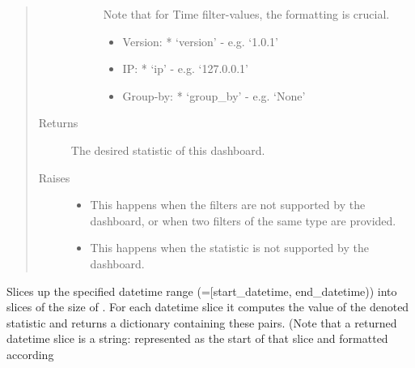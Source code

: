 \documentclass[letterpaper,10pt,english]{sphinxmanual}
\begin{document}
\begin{fulllineitems}
\begin{fulllineitems}
\begin{quote}
\begin{description}
\begin{description}
Note that for Time filter-values, the formatting is crucial.
\begin{itemize}
\item {} 
Version:
* ‘version’ - e.g. ‘1.0.1’

\item {} 
IP:
* ‘ip’ - e.g. ‘127.0.0.1’

\item {} 
Group-by:
* ‘group\_by’ - e.g. ‘None’

\end{itemize}

\end{description}


\item[{Returns}] \leavevmode
The desired statistic of this dashboard.

\item[{Raises}] \leavevmode\begin{itemize}
\item {} 
 \textendash{} This happens when the filters are not supported by the dashboard, or when two filters of
the same type are provided.

\item {} 
 \textendash{} This happens when the statistic is not supported by the dashboard.

\end{itemize}

\end{description}\end{quote}

\end{fulllineitems}


\begin{fulllineitems}
\label{\detokenize{pydash_app.dashboard.entity:pydash_app.dashboard.entity.Dashboard.statistic_per_timeslice}}
Slices up the specified datetime range (={[}start\_datetime, end\_datetime)) into slices of the size of .
For each datetime slice it computes the value of the denoted statistic and returns a dictionary containing these pairs.
(Note that a returned datetime slice is a string: represented as the start of that slice and formatted according
\begin{quote}


\end{quote}
\end{fulllineitems}
\end{fulllineitems}
\end{document}
